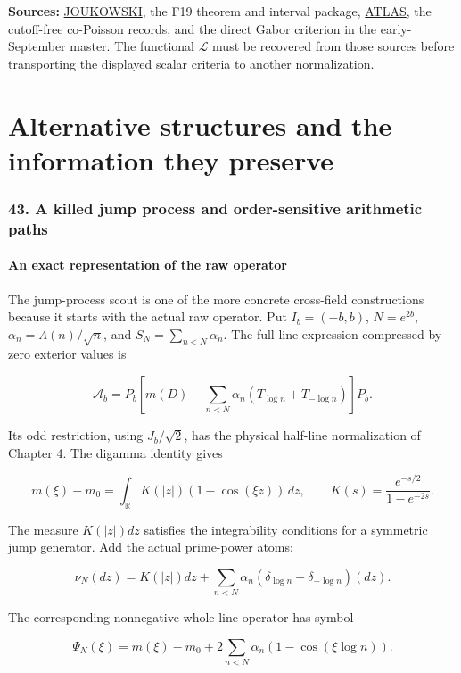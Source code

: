 \documentclass[
  10pt,
  a4paper,
  10pt,
  oneside,
  openany]{book}
\begin{document}
\textbf{Sources:} \hyperref[source-joukowski]{JOUKOWSKI}, the F19
theorem and interval package, \hyperref[source-atlas]{ATLAS}, the
cutoff-free co-Poisson records, and the direct Gabor criterion in the
early-September master. The functional \(\mathcal L\) must be recovered
from those sources before transporting the displayed scalar criteria to
another normalization.

\part{Alternative structures and the information they preserve}

\section{43. A killed jump process and order-sensitive arithmetic
paths}\label{ch-jumps}

\subsection{An exact representation of the raw
operator}\label{an-exact-representation-of-the-raw-operator}

The jump-process scout is one of the more concrete cross-field
constructions because it starts with the actual raw operator. Put
\(I_b=(-b,b)\), \(N=e^{2b}\), \(\alpha_n=\Lambda(n)/\sqrt n\), and
\(S_N=\sum_{n<N}\alpha_n\). The full-line expression compressed by zero
exterior values is

\[
 \mathcal A_b=P_b\left[m(D)-\sum_{n<N}\alpha_n
 (T_{\log n}+T_{-\log n})\right]P_b.
 \tag{43.1}\label{eq:43.1}
\]

Its odd restriction, using \(J_b/\sqrt2\), has the physical half-line
normalization of Chapter 4. The digamma identity gives

\[
 m(\xi)-m_0=\int_{\mathbb R}K(|z|)(1-\cos(\xi z))\,dz,
 \qquad K(s)=\frac{e^{-s/2}}{1-e^{-2s}}.
\]

The measure \(K(|z|)dz\) satisfies the integrability conditions for a
symmetric jump generator. Add the actual prime-power atoms:

\[
 \nu_N(dz)=K(|z|)dz+
 \sum_{n<N}\alpha_n(\delta_{\log n}+\delta_{-\log n})(dz).
 \tag{43.2}\label{eq:43.2}
\]

The corresponding nonnegative whole-line operator has symbol

\[
 \Psi_N(\xi)=m(\xi)-m_0+
 2\sum_{n<N}\alpha_n(1-\cos(\xi\log n)).
\]
\end{document}
